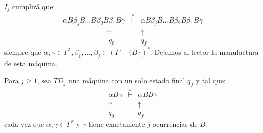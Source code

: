 \begin{frame}
  \PN $I_{j}$ cumplirá que:
  \begin{equation*}
    \begin{array}{lcr}
      \alpha B \beta_{j} B \dotsc B \beta_{2} B \beta_{1} B \gamma &\overset{\ast}{\vdash}& \alpha B \beta_{j} B \dotsc
        B \beta_{2} B \beta_{1} B \gamma \\
      \ \ \ \ \ \ \ \ \ \ \ \ \ \ \ \ \ \ \ \ \ \ \ \ \ \ \ \ \uparrow && \uparrow \ \ \ \ \ \ \ \ \ \ \ \ \ \ \ \ \ \
        \ \ \ \ \ \ \ \ \ \  \\
      \ \ \ \ \ \ \ \ \ \ \ \ \ \ \ \ \ \ \ \ \ \ \ \ \ \ \ \ \ q_{0} && q_{f} \ \ \ \ \ \ \ \ \ \ \ \ \ \ \ \ \ \ \ \
        \ \ \ \ \ \ \ \
    \end{array}%
  \end{equation*}%
  \PN siempre que $\alpha, \gamma \in \Gamma^{\ast}, \beta_{1}, \dotsc, \beta_{j} \in (\Gamma - \{B\})^{\ast}$. Dejamos
  al lector la manufactura de esta máquina.

  \vspace{3mm}
  \PN Para $j \geq 1$, sea $TD_{j}$ una máquina con un solo estado final $q_{f}$ y tal que:
  \begin{equation*}
    \begin{array}{ccc}
      \alpha B \gamma &\overset{\ast}{\vdash}& \alpha BB \gamma \\
      \uparrow  && \uparrow \ \ \\
      q_{0} &  & q_{f} \ \
    \end{array}
  \end{equation*}
  \PN cada vez que $\alpha, \gamma \in \Gamma^{\ast}$ y $\gamma$ tiene exactamente $j$ ocurrencias de $B$.
\end{frame}

